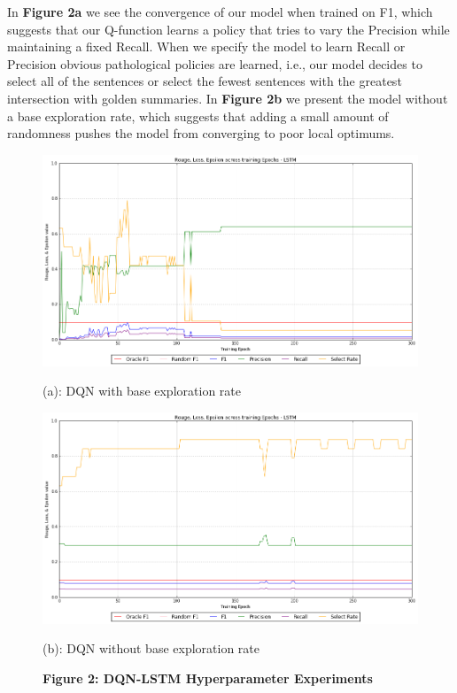 \documentclass[12pt]{article}
\begin{document}
In \textbf{Figure 2a} we see the convergence of our model when trained on F1, which suggests that our Q-function learns a policy that tries to vary the Precision while maintaining a fixed Recall. When we specify the model to learn Recall or Precision obvious pathological policies are learned, i.e., our model decides to select all of the sentences or select the fewest sentences with the greatest intersection with golden summaries. In  \textbf{Figure 2b} we present the model without a base exploration rate, which suggests that adding a small amount of randomness pushes the model from converging to poor local optimums.  

\begin{figure}[!tbp]
  \centering
  \begin{minipage}[b]{0.4\textwidth}
    \captionsetup{labelformat=empty}
    \includegraphics[width=\textwidth]{DQN_LSTM_Precision}
    \caption{ \scriptsize (a): DQN with base exploration rate}
  \end{minipage}
  \hfill
  \begin{minipage}[b]{0.4\textwidth}
    \captionsetup{labelformat=empty}
    \includegraphics[width=\textwidth]{DQN_LSTM_Recall}
    \caption{\scriptsize (b): DQN without base exploration rate}
  \end{minipage}
    \captionsetup{labelformat=empty}
    \caption{\textbf{Figure 2: DQN-LSTM Hyperparameter Experiments}}
\end{figure}
\end{document}
